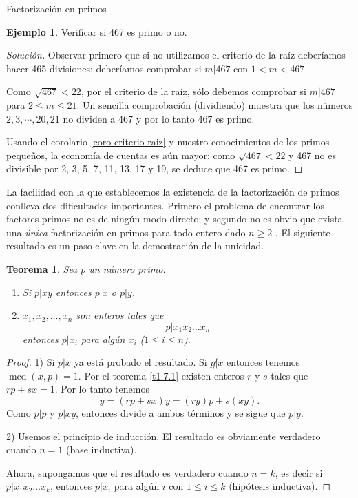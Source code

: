 \documentclass[11pt,spanish,makeidx]{amsbook}
\newtheorem{teorema}{Teorema}[section]
\theoremstyle{definition}
\newtheorem{ejemplo}{Ejemplo}[section]
\theoremstyle{remark}
\newcommand \mcd{\operatorname{mcd}}
\begin{document}
\begin{section}{Factorización en primos}
\begin{ejemplo} Verificar si 467 es primo o no.
\begin{proof}[Solución]
	 Observar primero que si no utilizamos el criterio de la raíz deberíamos hacer 465 divisiones: deberíamos comprobar si $m|467$ con  $1<m <467$. 
	
	Como $\sqrt{467} < 22$, por el criterio de la raíz, sólo debemos comprobar si $m|467$ para $2\le m \le 21$. Un sencilla comprobación (dividiendo) muestra que los números $2,3,\cdots,20,21$ no  dividen a 467 y por  lo tanto 467 es primo.
	
	Usando el corolario \ref{coro-criterio-raiz} y nuestro conocimientos de los primos pequeños,  la economía de cuentas es aún mayor: como $\sqrt{467} < 22$ y 467 no es divisible por 2, 3, 5, 7, 11, 13, 17 y 19, se deduce que 467 es primo. 
\end{proof}
\end{ejemplo}

La facilidad con la que establecemos la existencia de la factorización de primos conlleva dos dificultades importantes. Primero el problema de encontrar los factores primos no es de ningún modo directo; y segundo no es obvio que exista una {\it única} factorización en primos para todo entero dado $n\ge 2$ . El siguiente resultado es un paso clave en la demostración de la unicidad.

\begin{teorema}\label{t1.8} Sea $p$  un número  primo.

\begin{enumerate} 
\item Si $p|xy$ entonces $p|x$ o $p|y$.
\item $x_1,x_2,\ldots,x_n$ son enteros tales que
$$
p|x_1x_2\ldots x_n
$$
entonces $p|x_i$ para algún $x_i$ ($1\le i \le n$).
\end{enumerate}
\end{teorema}
\begin{proof} 1)  Si $p|x$ ya está probado el resultado. Si $p{{\not|}}x$ entonces tenemos $\mcd(x,p)=1$. Por el teorema \ref{t1.7.1} existen enteros $r$ y $s$ tales que $rp+sx=1$. Por lo tanto tenemos
$$
y =(rp+sx)y =(ry)p+s(xy).
$$
Como $p|p$ y $p|xy$, entonces divide a ambos términos y se sigue que $p|y$. 

2) Usemos el principio de inducción. El resultado es obviamente verdadero cuando $n=1$ (base inductiva). 

Ahora, supongamos que el resultado es verdadero cuando $n=k$, es decir si $p|x_1x_2\ldots x_k$, entonces  $p|x_i$ para algún $i$ con $1\le i \le k$ (hipótesis inductiva).


\end{proof}
\end{section}
\end{document}

